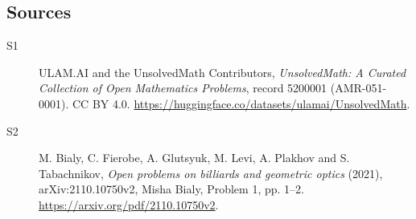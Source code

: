 \documentclass[11pt]{article}
\begin{document}
\subsection{Sources}
\begin{description}
\item[\hypertarget{source:5200001:1}{S1}] ULAM.AI and the UnsolvedMath Contributors, \emph{UnsolvedMath: A Curated Collection of Open Mathematics Problems}, record 5200001 (AMR-051-0001). CC BY 4.0. \url{https://huggingface.co/datasets/ulamai/UnsolvedMath}.
\item[\hypertarget{source:5200001:2}{S2}] M. Bialy, C. Fierobe, A. Glutsyuk, M. Levi, A. Plakhov and S. Tabachnikov, \emph{Open problems on billiards and geometric optics} (2021), arXiv:2110.10750v2, Misha Bialy, Problem 1, pp. 1--2. \url{https://arxiv.org/pdf/2110.10750v2}.
\end{description}
\label{end:5200001}
\end{document}
